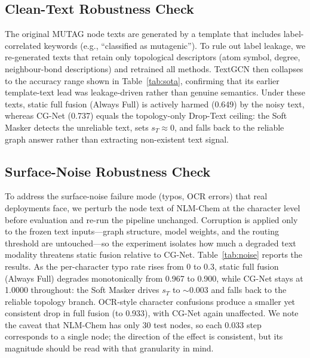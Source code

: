 \documentclass[preprint,12pt,authoryear]{elsarticle}
\begin{document}
\subsection{Clean-Text Robustness Check}
\label{sec:cleantext}
The original MUTAG node texts are generated by a template that includes label-correlated keywords (e.g., ``classified as mutagenic''). To rule out label leakage, we re-generated texts that retain only topological descriptors (atom symbol, degree, neighbour-bond descriptions) and retrained all methods. TextGCN then collapses to the accuracy range shown in Table~\ref{tab:sota}, confirming that its earlier template-text lead was leakage-driven rather than genuine semantics. Under these texts, static full fusion (Always Full) is actively harmed (0.649) by the noisy text, whereas CG-Net (0.737) equals the topology-only Drop-Text ceiling: the Soft Masker detects the unreliable text, sets $s_T\approx0$, and falls back to the reliable graph answer rather than extracting non-existent text signal.

\subsection{Surface-Noise Robustness Check}
\label{sec:surfacenoise}
To address the surface-noise failure mode (typos, OCR errors) that real deployments face, we perturb the node text of NLM-Chem at the character level before evaluation and re-run the pipeline unchanged. Corruption is applied only to the frozen text inputs---graph structure, model weights, and the routing threshold are untouched---so the experiment isolates how much a degraded text modality threatens static fusion relative to CG-Net. Table~\ref{tab:noise} reports the results. As the per-character typo rate rises from 0 to 0.3, static full fusion (Always Full) degrades monotonically from 0.967 to 0.900, while CG-Net stays at 1.0000 throughout: the Soft Masker drives $s_T$ to $\sim$0.003 and falls back to the reliable topology branch. OCR-style character confusions produce a smaller yet consistent drop in full fusion (to 0.933), with CG-Net again unaffected. We note the caveat that NLM-Chem has only 30 test nodes, so each 0.033 step corresponds to a single node; the direction of the effect is consistent, but its magnitude should be read with that granularity in mind.
\end{document}
